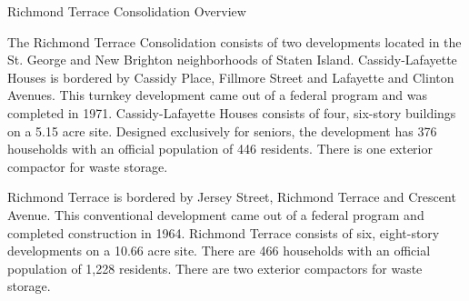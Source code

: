 Richmond Terrace Consolidation Overview

The Richmond Terrace Consolidation consists of two developments located in the St. George and New Brighton neighborhoods of Staten Island. Cassidy-Lafayette Houses is bordered by Cassidy Place, Fillmore Street and Lafayette and Clinton Avenues. This turnkey development came out of a federal program and was completed in 1971. Cassidy-Lafayette Houses consists of four, six-story buildings on a 5.15 acre site. Designed exclusively for seniors, the development has 376 households with an official population of 446 residents. There is one exterior compactor for waste storage.

Richmond Terrace is bordered by Jersey Street, Richmond Terrace and Crescent Avenue. This conventional development came out of a federal program and completed construction in 1964. Richmond Terrace consists of six, eight-story developments on a 10.66 acre site. There are 466 households with an official population of 1,228 residents. There are two exterior compactors for waste storage.